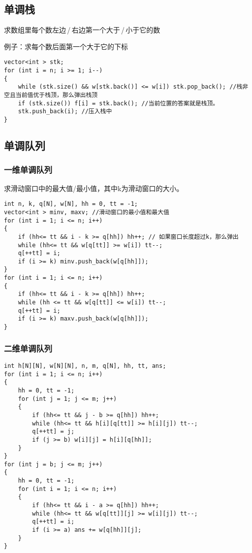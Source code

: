 \documentclass[a4paper, fontset=none]{ctexart}
\begin{document}
\subsection{单调栈}

求数组里每个数左边\,/\,右边第一个大于\,/\,小于它的数

例子：求每个数后面第一个大于它的下标
\begin{verbatim}
vector<int > stk;
for (int i = n; i >= 1; i--)
{
    while (stk.size() && w[stk.back()] <= w[i]) stk.pop_back(); //栈非空且当前值优于栈顶，那么弹出栈顶
    if (stk.size()) f[i] = stk.back(); //当前位置的答案就是栈顶。
    stk.push_back(i); //压入栈中
}
\end{verbatim}

\subsection{单调队列}
\subsubsection{一维单调队列}

求滑动窗口中的最大值/最小值，其中k为滑动窗口的大小。
\begin{verbatim}
int n, k, q[N], w[N], hh = 0, tt = -1;
vector<int > minv, maxv; //滑动窗口的最小值和最大值
for (int i = 1; i <= n; i++)
{
    if (hh<= tt && i - k >= q[hh]) hh++; // 如果窗口长度超过k，那么弹出
    while (hh<= tt && w[q[tt]] >= w[i]) tt--;
    q[++tt] = i;
    if (i >= k) minv.push_back(w[q[hh]]);
}
for (int i = 1; i <= n; i++)
{
    if (hh<= tt && i - k >= q[hh]) hh++;
    while (hh <= tt && w[q[tt]] <= w[i]) tt--;
    q[++tt] = i;
    if (i >= k) maxv.push_back(w[q[hh]]);
}
\end{verbatim}
\subsubsection{二维单调队列}
\begin{verbatim}
int h[N][N], w[N][N], n, m, q[N], hh, tt, ans;
for (int i = 1; i <= n; i++)
{
    hh = 0, tt = -1;
    for (int j = 1; j <= m; j++)
    {
        if (hh<= tt && j - b >= q[hh]) hh++;
        while (hh<= tt && h[i][q[tt]] >= h[i][j]) tt--;
        q[++tt] = j;
        if (j >= b) w[i][j] = h[i][q[hh]];
    }
}
for (int j = b; j <= m; j++)
{
    hh = 0, tt = -1;
    for (int i = 1; i <= n; i++)
    {
        if (hh<= tt && i - a >= q[hh]) hh++;
        while (hh<= tt && w[q[tt]][j] >= w[i][j]) tt--;
        q[++tt] = i;
        if (i >= a) ans += w[q[hh]][j];
    }
}
\end{verbatim}
\end{document}
